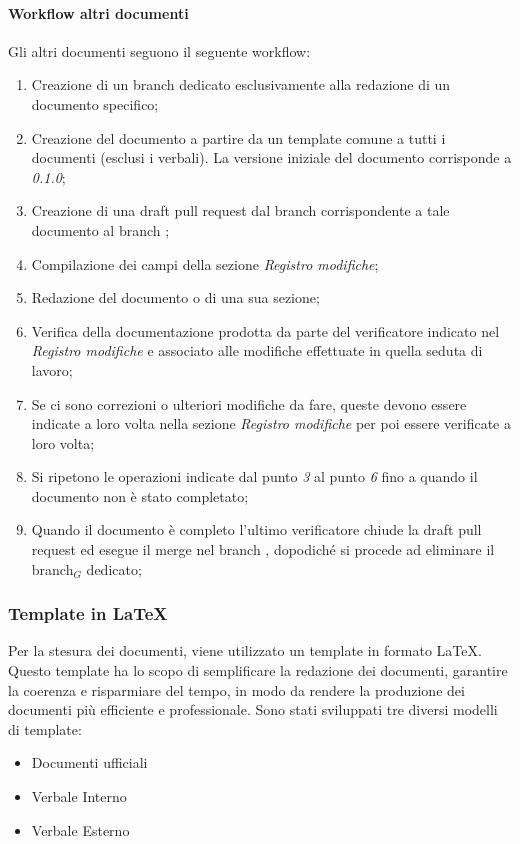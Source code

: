     \paragraph{Workflow altri documenti}
    Gli altri documenti seguono il seguente workflow:
    \begin{enumerate}
        \item Creazione di un branch dedicato esclusivamente alla redazione di un documento specifico;
        \item Creazione del documento a partire da un template comune a tutti i documenti (esclusi i verbali). La versione iniziale del documento corrisponde a \textit{0.1.0};
        \item Creazione di una draft pull request dal branch corrispondente a tale documento al branch ;
        \item Compilazione dei campi della sezione \textit{Registro modifiche};
        \item Redazione del documento o di una sua sezione;
        \item Verifica della documentazione prodotta da parte del verificatore indicato nel \textit{Registro modifiche} e associato alle modifiche effettuate in quella seduta di lavoro;
        \item Se ci sono correzioni o ulteriori modifiche da fare, queste 
        devono essere indicate a loro volta nella sezione \textit{Registro modifiche} per poi essere verificate a loro volta;
        \item Si ripetono le operazioni indicate dal punto \textit{3} al punto \textit{6} fino a quando il documento non è stato completato;
        \item Quando il documento è completo l'ultimo verificatore 
        chiude la draft pull request ed esegue il merge nel branch , dopodiché si procede ad eliminare il branch$_G$ dedicato;
    \end{enumerate}

\subsubsection{Template in \LaTeX}
Per la stesura dei documenti, viene utilizzato un template in formato \LaTeX. Questo template ha lo scopo di semplificare la redazione dei documenti, garantire la coerenza e risparmiare del tempo, in modo da rendere la produzione dei documenti più efficiente e professionale. Sono stati sviluppati tre diversi modelli di template:
\begin{itemize}
    \item Documenti ufficiali
    \item Verbale Interno
    \item Verbale Esterno
\end{itemize}

